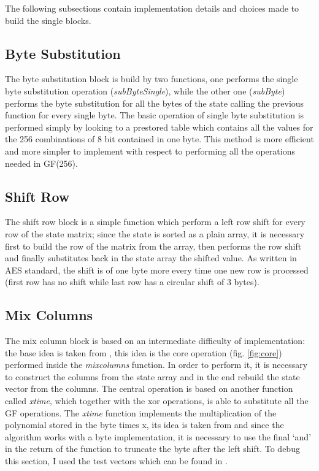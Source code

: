\documentclass{article}
\begin{document}
The following subsections contain implementation details and choices made to build the single blocks.

\subsection{Byte Substitution}

The byte substitution block is build by two functions, one performs the single byte substitution operation (\textit {subByteSingle}), while the other one (\textit {subByte}) performs the byte substitution for all the bytes of the state calling the previous function for every single byte. The basic operation of single byte substitution is performed simply by looking to a prestored table which contains all the values for the 256 combinations of 8 bit contained in one byte. This method is more efficient and more simpler to implement with respect to performing all the operations needed in GF(256).

\subsection{Shift Row}

The shift row block is a simple function which perform a left row shift for every row of the state matrix; since the state is sorted as a plain array, it is necessary first to build the row of the matrix from the array, then performs the row shift and finally substitutes back in the state array the shifted value. As written in AES standard, the shift is of one byte more every time one new row is processed (first row has no shift while last row has a circular shift of 3 bytes). 

\subsection{Mix Columns}

The mix column block is based on an intermediate difficulty of implementation: the base idea is taken from \cite{10.5555/560131}, this idea is the core operation (fig. \ref{fig:core}) performed inside the \textit{mixcolumns} function. In order to perform it, it is necessary to construct the columns from the state array and in the end rebuild the state vector from the columns. The central operation is based on another function called \textit{xtime}, which together with the xor operations, is able to substitute all the GF operations. The \textit{xtime} function implements the multiplication of the polynomial stored in the byte times x, its idea is taken from \cite{AESxtime} and since the algorithm works with a byte implementation, it is necessary to use the final `and' in the return of the function to truncate the byte after the left shift. \newline
To debug this section, I used the test vectors which can be found in \cite{AESmixcolumn}.
\end{document}
